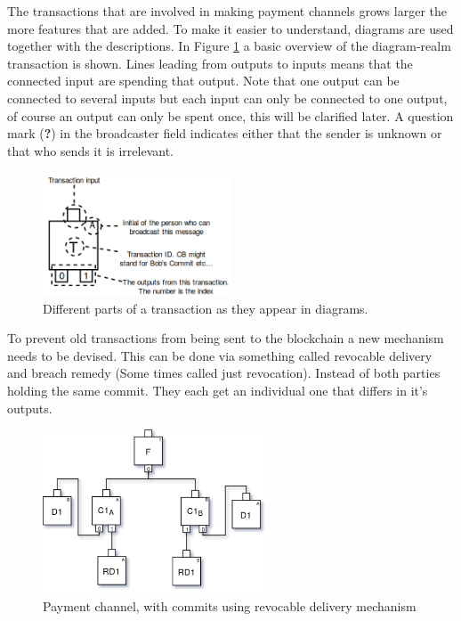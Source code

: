 The transactions that are involved in making payment channels grows larger the more features that are added. To make it easier to understand, diagrams are used together with the descriptions. In Figure \ref{fig:anatomy} a basic overview of the diagram-realm transaction is shown. Lines leading from outputs to inputs means that the connected input are spending that output. Note that one output can be connected to several inputs but each input can only be connected to one output, of course an output can only be spent once, this will be clarified later. A question mark (\textbf{?}) in the broadcaster field indicates either that the sender is unknown or that who sends it is irrelevant. 


\begin{figure}[H]
	\centering
	\includegraphics[width=0.5\textwidth]{background/images/tx_anatomy.png}
	\caption{Different parts of a transaction as they appear in diagrams.}
	\label{fig:anatomy}
\end{figure}

\label{breach_remedy}
To prevent old transactions from being sent to the blockchain a new mechanism needs to be devised. This can be done via something called revocable delivery and breach remedy (Some times called just revocation).
Instead of both parties holding the same commit. They each get an individual one that differs in it's outputs. 

\begin{figure}[H]
	\centering
	\includegraphics[width=0.6\textwidth]{background/images/payment_channel_pre_breach.png}
	\caption{Payment channel, with commits using revocable delivery mechanism}
	\label{fig:pre-breach}
\end{figure}

